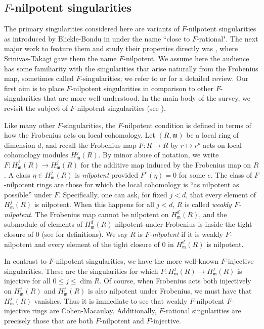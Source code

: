 \documentclass{amsproc}
\theoremstyle{definition}
\theoremstyle{remark}
\numberwithin{equation}{section}
\newcommand{\fm}{\mathfrak{m}}
\begin{document}
\subsection{\texorpdfstring{$F$}{F}-nilpotent singularities} The primary singularities considered here are variants of $F$-nilpotent singularities as introduced by Blickle-Bondu in \cite{BB05} under the name ``close to $F$-rational". The next major work to feature them and study their properties directly was \cite{ST17}, where Srinivas-Takagi gave them the name $F$-nilpotent. We assume here the audience has some familiarity with the singularities that arise naturally from the Frobenius map, sometimes called $F$-singularities; we refer to \cite{MP} or \cite{SS} for a detailed review. Our first aim is to place $F$-nilpotent singularities in comparison to other $F$-singularities that are more well understood. In the main body of the survey, we revisit the subject of $F$-nilpotent singularities (see ). 


Like many other $F$-singularities, the $F$-nilpotent condition is defined in terms of how the Frobenius acts on local cohomology. Let $(R,\fm)$ be a local ring of dimension $d$, and recall the Frobenius map $F:R\rightarrow R$ by $r\mapsto r^p$ acts on local cohomology modules $H_\fm^j(R)$. By minor abuse of notation, we write $F : H_\fm^j(R) \to H_\fm^j(R)$ for the additive map induced by the Frobenius map on $R$. A class $\eta \in H_\fm^j(R)$ is {\it nilpotent} provided $F^e(\eta) = 0$ for some $e$. The class of $F$-nilpotent rings are those for which the local cohomology is ``as nilpotent as possible'' under $F$. Specifically, one can ask, for fixed $j < d$, that every element of $H_\fm^j(R)$ is nilpotent. When this happens for all $j < d$, $R$ is called {\it weakly $F$-nilpotent}. The Frobenius map cannot be nilpotent on $H^{d}_\fm(R)$, and the submodule of elements of $H^d_\fm(R)$ nilpotent under Frobenius is inside the tight closure of $0$ (see  for definitions). We say $R$ is {\it $F$-nilpotent} if it is weakly $F$-nilpotent and every element of the tight closure of $0$ in $H^{d}_\fm(R)$ is nilpotent.

In contrast to $F$-nilpotent singularities, we have the more well-known $F$-injective singularities. These are the singularities for which $F:H^j_\fm(R) \rightarrow H^j_\fm(R)$ is injective for all $0 \le j \le \dim R$. Of course, when Frobenius acts both injectively on $H_\fm^j(R)$ and $H_\fm^j(R)$ is also nilpotent under Frobenius, we must have that $H_\fm^j(R)$ vanishes. Thus it is immediate to see that weakly $F$-nilpotent $F$-injective rings are Cohen-Macaulay. Additionally, $F$-rational singularities are precisely those that are both $F$-nilpotent and $F$-injective.
\end{document}
